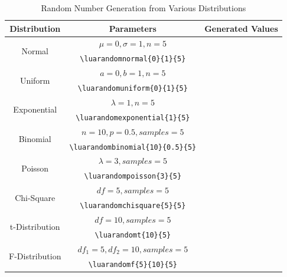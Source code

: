 \begin{table}[h]
	\centering
	\renewcommand{\arraystretch}{2} %
	\setlength{\tabcolsep}{10pt} %
	\begin{tabular}{|c|c|c|}
		\hline
		\textbf{Distribution} & \textbf{Parameters} & \textbf{Generated Values} \\
		\hline
		\multirow{2}{*}{Normal} & $\mu = 0, \sigma = 1, n=5$ & \luarandomnormal{0}{1}{5} \\
		& \verb|\luarandomnormal{0}{1}{5}| & \\
		\hline
		\multirow{2}{*}{Uniform} & $a = 0, b = 1, n=5$ & \luarandomuniform{0}{1}{5} \\
		& \verb|\luarandomuniform{0}{1}{5}| & \\
		\hline
		\multirow{2}{*}{Exponential} & $\lambda = 1, n=5$ & \luarandomexponential{1}{5} \\
		& \verb|\luarandomexponential{1}{5}| & \\
		\hline
		\multirow{2}{*}{Binomial} & $n = 10, p = 0.5, samples=5$ & \luarandombinomial{10}{0.5}{5} \\
		& \verb|\luarandombinomial{10}{0.5}{5}| & \\
		\hline
		\multirow{2}{*}{Poisson} & $\lambda = 3, samples=5$ & \luarandompoisson{3}{5} \\
		& \verb|\luarandompoisson{3}{5}| & \\
		\hline
		\multirow{2}{*}{Chi-Square} & $df = 5, samples=5$ & \luarandomchisquare{5}{5} \\
		& \verb|\luarandomchisquare{5}{5}| & \\
		\hline
		\multirow{2}{*}{t-Distribution} & $df = 10, samples=5$ & \luarandomt{10}{5} \\
		& \verb|\luarandomt{10}{5}| & \\
		\hline
		\multirow{2}{*}{F-Distribution} & $df_1 = 5, df_2 = 10, samples=5$ & \luarandomf{5}{10}{5} \\
		& \verb|\luarandomf{5}{10}{5}| & \\
		\hline
	\end{tabular}
	\caption{Random Number Generation from Various Distributions}
\end{table}